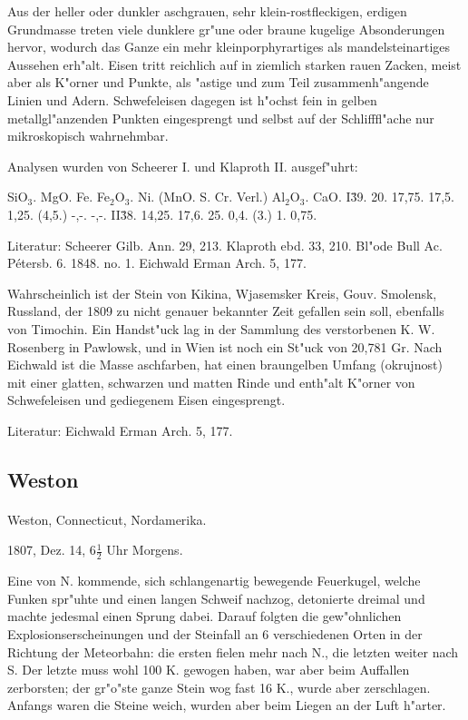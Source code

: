 \documentclass[a4paper, 11pt, oneside]{article}
\begin{document}
Aus der heller oder dunkler aschgrauen, sehr klein-rostfleckigen, erdigen Grundmasse treten viele dunklere gr"une oder braune kugelige Absonderungen hervor, wodurch das Ganze ein mehr kleinporphyrartiges als mandelsteinartiges Aussehen erh"alt. Eisen tritt reichlich auf in ziemlich starken rauen Zacken, meist aber als K"orner und Punkte, als "astige und zum Teil zusammenh"angende Linien und Adern. Schwefeleisen dagegen ist h"ochst fein in gelben metallgl"anzenden Punkten eingesprengt und selbst auf der Schlifffl"ache nur mikroskopisch wahrnehmbar.

Analysen wurden von Scheerer I. und Klaproth II. ausgef"uhrt:

SiO$_{3}$. MgO. Fe. Fe$_{2}$O$_{3}$. Ni. (MnO. S. Cr. Verl.) Al$_{2}$O$_{3}$. CaO.  
I\. 39. 20. 17,75. 17,5. 1,25. (4,5.) -,-. -,-.  
II\. 38. 14,25. 17,6. 25. 0,4. (3.) 1. 0,75.

Literatur: Scheerer Gilb. Ann. 29, 213. Klaproth ebd. 33, 210. Bl"ode Bull Ac. Pétersb. 6. 1848. no. 1. Eichwald Erman Arch. 5, 177.

Wahrscheinlich ist der Stein von Kikina, Wjasemsker Kreis, Gouv. Smolensk, Russland, der 1809 zu nicht genauer bekannter Zeit gefallen sein soll, ebenfalls von Timochin. Ein Handst"uck lag in der Sammlung des verstorbenen K. W. Rosenberg in Pawlowsk, und in Wien ist noch ein St"uck von 20,781 Gr. Nach Eichwald ist die Masse aschfarben, hat einen braungelben Umfang (okrujnost) mit einer glatten, schwarzen und matten Rinde und enth"alt K"orner von Schwefeleisen und gediegenem Eisen eingesprengt.

Literatur: Eichwald Erman Arch. 5, 177.

\subsection{Weston}
\normalsize
\paragraph{}
Weston, Connecticut, Nordamerika.

1807, Dez. 14, $6\frac{1}{2}$ Uhr Morgens.

Eine von N. kommende, sich schlangenartig bewegende Feuerkugel, welche Funken spr"uhte und einen langen Schweif nachzog, detonierte dreimal und machte jedesmal einen Sprung dabei. Darauf folgten die gew"ohnlichen Explosionserscheinungen und der Steinfall an 6 verschiedenen Orten in der Richtung der Meteorbahn: die ersten fielen mehr nach N., die letzten weiter nach S. Der letzte muss wohl 100 K. gewogen haben, war aber beim Auffallen zerborsten; der gr"o"ste ganze Stein wog fast 16 K., wurde aber zerschlagen. Anfangs waren die Steine weich, wurden aber beim Liegen an der Luft h"arter.
\end{document}
